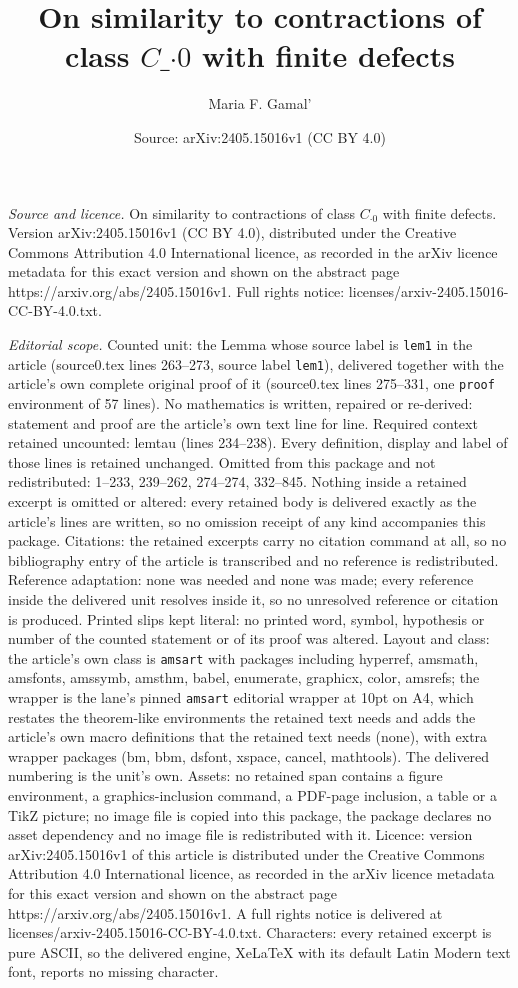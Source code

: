 \documentclass[10pt,a4paper]{amsart}
\title[On similarity to contractions of class $C\_{\cdot 0}$ with fi]{On similarity to contractions of class $C\_{\cdot 0}$ with finite defects}
\author{Maria F. Gamal'}
\date{Source: arXiv:2405.15016v1 (CC BY 4.0)}
\begin{document}
\maketitle

\noindent\emph{Source and licence.} On similarity to contractions of class $C_{\cdot 0}$ with finite defects. Version arXiv:2405.15016v1 (CC BY 4.0), distributed under the Creative Commons Attribution 4.0 International licence, as recorded in the arXiv licence metadata for this exact version and shown on the abstract page https://arxiv.org/abs/2405.15016v1. Full rights notice: licenses/arxiv-2405.15016-CC-BY-4.0.txt.\par\smallskip

\noindent\textit{Editorial scope.} Counted unit: the Lemma whose source label is \texttt{lem1} in the article (source0.tex lines 263--273, source label \texttt{lem1}), delivered together with the article's own complete original proof of it (source0.tex lines 275--331, one \texttt{proof} environment of 57 lines). No mathematics is written, repaired or re-derived: statement and proof are the article's own text line for line. Required context retained uncounted: lemtau (lines 234--238). Every definition, display and label of those lines is retained unchanged. Omitted from this package and not redistributed: 1--233, 239--262, 274--274, 332--845. Nothing inside a retained excerpt is omitted or altered: every retained body is delivered exactly as the article's lines are written, so no omission receipt of any kind accompanies this package. Citations: the retained excerpts carry no citation command at all, so no bibliography entry of the article is transcribed and no reference is redistributed. Reference adaptation: none was needed and none was made; every reference inside the delivered unit resolves inside it, so no unresolved reference or citation is produced. Printed slips kept literal: no printed word, symbol, hypothesis or number of the counted statement or of its proof was altered. Layout and class: the article's own class is \texttt{amsart} with packages including hyperref, amsmath, amsfonts, amssymb, amsthm, babel, enumerate, graphicx, color, amsrefs; the wrapper is the lane's pinned \texttt{amsart} editorial wrapper at 10pt on A4, which restates the theorem-like environments the retained text needs and adds the article's own macro definitions that the retained text needs (none), with extra wrapper packages (bm, bbm, dsfont, xspace, cancel, mathtools). The delivered numbering is the unit's own. Assets: no retained span contains a figure environment, a graphics-inclusion command, a PDF-page inclusion, a table or a TikZ picture; no image file is copied into this package, the package declares no asset dependency and no image file is redistributed with it. Licence: version arXiv:2405.15016v1 of this article is distributed under the Creative Commons Attribution 4.0 International licence, as recorded in the arXiv licence metadata for this exact version and shown on the abstract page https://arxiv.org/abs/2405.15016v1. A full rights notice is delivered at licenses/arxiv-2405.15016-CC-BY-4.0.txt. Characters: every retained excerpt is pure ASCII, so the delivered engine, XeLaTeX with its default Latin Modern text font, reports no missing character.
\end{document}
